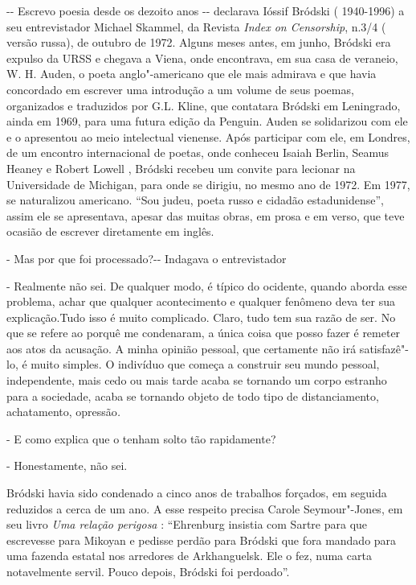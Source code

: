 -\/- Escrevo poesia desde os dezoito anos -\/- declarava Ióssif Bródski
( 1940-1996) a seu entrevistador Michael Skammel, da Revista \emph{Index
on Censorship}, n.3/4 ( versão russa), de outubro de 1972. Alguns meses
antes, em junho, Bródski era expulso da URSS e chegava a Viena, onde
encontrava, em sua casa de veraneio, W. H. Auden, o poeta
anglo"-americano que ele mais admirava e que havia concordado em escrever
uma introdução a um volume de seus poemas, organizados e traduzidos por
G.L. Kline, que contatara Bródski em Leningrado, ainda em 1969, para uma
futura edição da Penguin. Auden se solidarizou com ele e o apresentou ao
meio intelectual vienense. Após participar com ele, em Londres, de um
encontro internacional de poetas, onde conheceu Isaiah Berlin, Seamus
Heaney e Robert Lowell , Bródski recebeu um convite para lecionar na
Universidade de Michigan, para onde se dirigiu, no mesmo ano de 1972. Em
1977, se naturalizou americano. ``Sou judeu, poeta russo e cidadão
estadunidense'', assim ele se apresentava, apesar das muitas obras, em
prosa e em verso, que teve ocasião de escrever diretamente em inglês.

- Mas por que foi processado?-\/- Indagava o entrevistador

- Realmente não sei. De qualquer modo, é típico do ocidente, quando
aborda esse problema, achar que qualquer acontecimento e qualquer
fenômeno deva ter sua explicação.Tudo isso é muito complicado. Claro,
tudo tem sua razão de ser. No que se refere ao porquê me condenaram, a
única coisa que posso fazer é remeter aos atos da acusação. A minha
opinião pessoal, que certamente não irá satisfazê"-lo, é muito simples. O
indivíduo que começa a construir seu mundo pessoal, independente, mais
cedo ou mais tarde acaba se tornando um corpo estranho para a sociedade,
acaba se tornando objeto de todo tipo de distanciamento, achatamento,
opressão\emph{.}

- E como explica que o tenham solto tão rapidamente?

- Honestamente, não sei.

Bródski havia sido condenado a cinco anos de trabalhos forçados, em
seguida reduzidos a cerca de um ano. A esse respeito precisa Carole
Seymour"-Jones, em seu livro \emph{Uma relação perigosa} : ``Ehrenburg
insistia com Sartre para que escrevesse para Mikoyan e pedisse perdão
para Bródski que fora mandado para uma fazenda estatal nos arredores de
Arkhanguelsk. Ele o fez, numa carta notavelmente servil. Pouco depois,
Bródski foi perdoado''.

